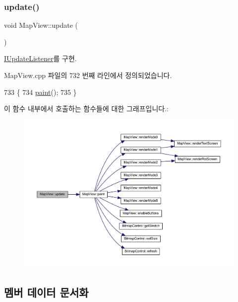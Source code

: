 \subsubsection{\texorpdfstring{update()}{update()}}
{\footnotesize\ttfamily void Map\+View\+::update (\begin{DoxyParamCaption}{ }\end{DoxyParamCaption})\hspace{0.3cm}{\ttfamily [virtual]}}



\mbox{\hyperlink{class_i_update_listener_ac03b85f52e858d0bbd08a4984b2cb929}{I\+Update\+Listener}}를 구현.



Map\+View.\+cpp 파일의 732 번째 라인에서 정의되었습니다.


\begin{DoxyCode}
733 \{
734   \mbox{\hyperlink{class_map_view_a89edf3053cffa4a68516178dbd987339}{paint}}();
735 \}
\end{DoxyCode}
이 함수 내부에서 호출하는 함수들에 대한 그래프입니다.\+:
\nopagebreak
\begin{figure}[H]
\begin{center}
\leavevmode
\includegraphics[width=350pt]{class_map_view_ac41eb53f60bccbfe4f5601f1a997c51e_cgraph}
\end{center}
\end{figure}


\subsection{멤버 데이터 문서화}
\mbox{\label{class_map_view_ad1561bbb87fe21907a1df6085855d1b1}} 
